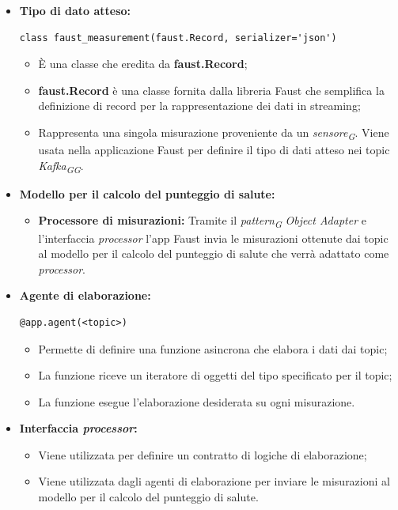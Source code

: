 \begin{itemize}
    \item \textbf{Tipo di dato atteso:}
     \begin{lstlisting}[style=code]
    class faust_measurement(faust.Record, serializer='json')
    \end{lstlisting}  
    \begin{itemize}
        \item È una classe che eredita da \textbf{faust.Record};
        \item \textbf{faust.Record} è una classe fornita dalla libreria Faust che semplifica la definizione di record per la rappresentazione dei dati in streaming;
        \item Rappresenta una singola misurazione proveniente da un \textit{sensore}\textsubscript{\textit{G}}. Viene usata nella applicazione Faust per definire il tipo di dati atteso nei topic \textit{Kafka}\textsubscript{\textit{G}}\textsubscript{\textit{G}}.
    \end{itemize}

    \item \textbf{Modello per il calcolo del punteggio di salute:}
    \begin{itemize}
        \item \textbf{Processore di misurazioni:}
        Tramite il \textit{pattern}\textsubscript{\textit{G}} \textit{Object Adapter} e l'interfaccia \textit{processor} l'app Faust invia le misurazioni ottenute dai topic al modello per il calcolo del punteggio di salute che verrà adattato come \textit{processor}.
    \end{itemize}

    \item \textbf{Agente di elaborazione:} 
    \begin{lstlisting}[style=code]
    @app.agent(<topic>)
    \end{lstlisting}  
    \begin{itemize}
        \item Permette di definire una funzione asincrona che elabora i dati dai topic;
        \item La funzione riceve un iteratore di oggetti del tipo specificato per il topic;
        \item La funzione esegue l'elaborazione desiderata su ogni misurazione.
    \end{itemize}

    \item \textbf{Interfaccia \textit{processor}:}
    \begin{itemize}
        \item Viene utilizzata per definire un contratto di logiche di elaborazione;
        \item Viene utilizzata dagli agenti di elaborazione per inviare le misurazioni al modello per il calcolo del punteggio di salute.
    \end{itemize}


\end{itemize}

